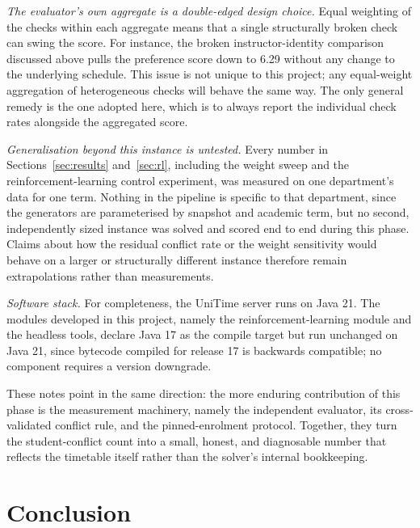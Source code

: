 \documentclass[journal]{IEEEtran}
\begin{document}
\emph{The evaluator's own aggregate is a double-edged design choice.} Equal weighting of the checks within each aggregate means that a single structurally broken check can swing the score. For instance, the broken instructor-identity comparison discussed above pulls the preference score down to 6.29 without any change to the underlying schedule. This issue is not unique to this project; any equal-weight aggregation of heterogeneous checks will behave the same way. The only general remedy is the one adopted here, which is to always report the individual check rates alongside the aggregated score.

\emph{Generalisation beyond this instance is untested.} Every number in Sections~\ref{sec:results} and~\ref{sec:rl}, including the weight sweep and the reinforcement-learning control experiment, was measured on one department's data for one term. Nothing in the pipeline is specific to that department, since the generators are parameterised by snapshot and academic term, but no second, independently sized instance was solved and scored end to end during this phase. Claims about how the residual conflict rate or the weight sensitivity would behave on a larger or structurally different instance therefore remain extrapolations rather than measurements.

\emph{Software stack.} For completeness, the UniTime server runs on Java 21. The modules developed in this project, namely the reinforcement-learning module and the headless tools, declare Java 17 as the compile target but run unchanged on Java 21, since bytecode compiled for release 17 is backwards compatible; no component requires a version downgrade.

These notes point in the same direction: the more enduring contribution of this phase is the measurement machinery, namely the independent evaluator, its cross-validated conflict rule, and the pinned-enrolment protocol. Together, they turn the student-conflict count into a small, honest, and diagnosable number that reflects the timetable itself rather than the solver's internal bookkeeping.

\section{Conclusion}
\label{sec:conclusion}
\enlargethispage{6\baselineskip}
\end{document}
